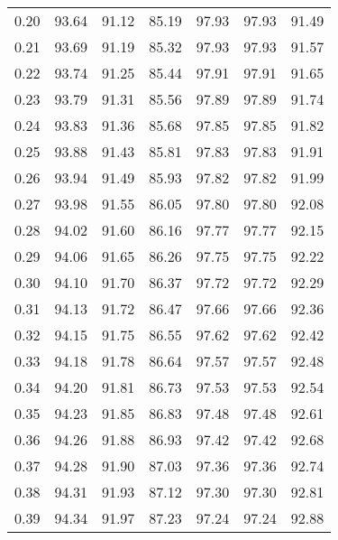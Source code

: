 \begin{tabular}{|c|c|c|c|c|c|c|}
      0.20 &     93.64 &     91.12 &      85.19 &   97.93 &      97.93 &         91.49 \\
      0.21 &     93.69 &     91.19 &      85.32 &   97.93 &      97.93 &         91.57 \\
      0.22 &     93.74 &     91.25 &      85.44 &   97.91 &      97.91 &         91.65 \\
      0.23 &     93.79 &     91.31 &      85.56 &   97.89 &      97.89 &         91.74 \\
      0.24 &     93.83 &     91.36 &      85.68 &   97.85 &      97.85 &         91.82 \\
      0.25 &     93.88 &     91.43 &      85.81 &   97.83 &      97.83 &         91.91 \\
      0.26 &     93.94 &     91.49 &      85.93 &   97.82 &      97.82 &         91.99 \\
      0.27 &     93.98 &     91.55 &      86.05 &   97.80 &      97.80 &         92.08 \\
      0.28 &     94.02 &     91.60 &      86.16 &   97.77 &      97.77 &         92.15 \\
      0.29 &     94.06 &     91.65 &      86.26 &   97.75 &      97.75 &         92.22 \\
      0.30 &     94.10 &     91.70 &      86.37 &   97.72 &      97.72 &         92.29 \\
      0.31 &     94.13 &     91.72 &      86.47 &   97.66 &      97.66 &         92.36 \\
      0.32 &     94.15 &     91.75 &      86.55 &   97.62 &      97.62 &         92.42 \\
      0.33 &     94.18 &     91.78 &      86.64 &   97.57 &      97.57 &         92.48 \\
      0.34 &     94.20 &     91.81 &      86.73 &   97.53 &      97.53 &         92.54 \\
      0.35 &     94.23 &     91.85 &      86.83 &   97.48 &      97.48 &         92.61 \\
      0.36 &     94.26 &     91.88 &      86.93 &   97.42 &      97.42 &         92.68 \\
      0.37 &     94.28 &     91.90 &      87.03 &   97.36 &      97.36 &         92.74 \\
      0.38 &     94.31 &     91.93 &      87.12 &   97.30 &      97.30 &         92.81 \\
      0.39 &     94.34 &     91.97 &      87.23 &   97.24 &      97.24 &         92.88 \\

\end{tabular}
